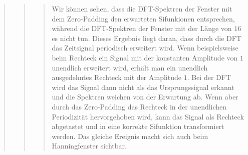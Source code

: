 \begin{quote}
\begin{quote}
\begin{quote}
        Wir können sehen, dass die DFT-Spektren der Fenster mit dem Zero-Padding
        den erwarteten Sifunkionen entsprechen, während die DFT-Spektren der
        Fenster mit der Länge von $16$ es nicht tun. Dieses Ergebnis liegt
        daran, dass durch die DFT das Zeitsignal periodisch erweitert wird. Wenn
        beispielsweise beim Rechteck ein Signal mit der konstanten Amplitude von
        $1$ unendlich erweitert wird, erhält man ein unendlich ausgedehntes Rechteck mit der
        Amplitude $1$. Bei der DFT wird das Signal dann nicht als das
        Ursprungssignal erkannt und die Spektren weichen von der Erwartung ab.
        Wenn aber durch das Zero-Padding das Rechteck in der unendlichen Periodizität hervorgehoben wird, 
        kann das Signal als Rechteck abgetastet und in eine korrekte Sifunktion transformiert
        werden. Das gleiche Ereignis macht sich auch beim Hanningfenster
        sichtbar. 
            
		\end{quote}
    \end{quote}
\end{quote}


